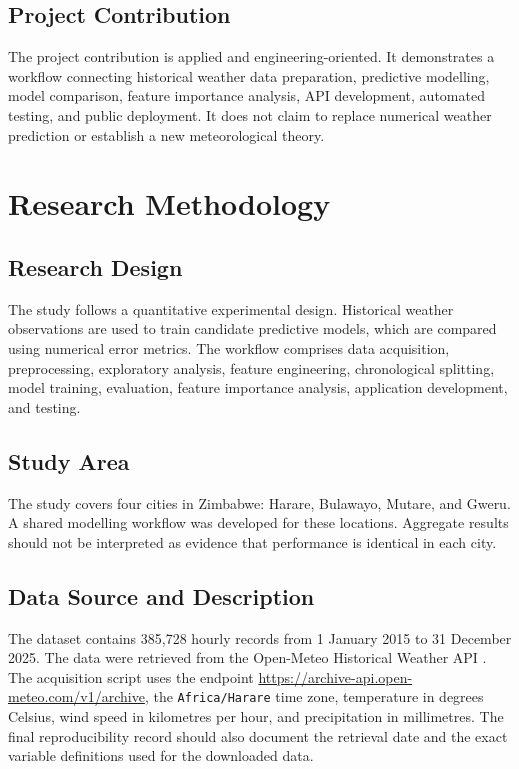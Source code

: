 \documentclass[12pt,a4paper]{article}
\begin{document}
	\subsection{Project Contribution}
	
	The project contribution is applied and engineering-oriented. It
	demonstrates a workflow connecting historical weather data
	preparation, predictive modelling, model comparison, feature
	importance analysis, API development, automated testing, and public
	deployment. It does not claim to replace numerical weather
	prediction or establish a new meteorological theory.
	
	\section{Research Methodology}
	
	\subsection{Research Design}
	
	The study follows a quantitative experimental design. Historical
	weather observations are used to train candidate predictive models,
	which are compared using numerical error metrics. The workflow
	comprises data acquisition, preprocessing, exploratory analysis,
	feature engineering, chronological splitting, model training,
	evaluation, feature importance analysis, application development,
	and testing.
	
	\subsection{Study Area}
	
	The study covers four cities in Zimbabwe: Harare, Bulawayo, Mutare,
	and Gweru. A shared modelling workflow was developed for these
	locations. Aggregate results should not be interpreted as evidence
	that performance is identical in each city.
	
	\subsection{Data Source and Description}
	
	The dataset contains 385,728 hourly records from 1 January 2015 to
	31 December 2025. The data were retrieved from the Open-Meteo
	Historical Weather API \cite{openmeteo}. The acquisition script uses the endpoint
	\url{https://archive-api.open-meteo.com/v1/archive}, the
	\texttt{Africa/Harare} time zone, temperature in degrees Celsius,
	wind speed in kilometres per hour, and precipitation in millimetres.
	The final reproducibility record should also document the retrieval
	date and the exact variable definitions used for the downloaded data.
	
\end{document}
